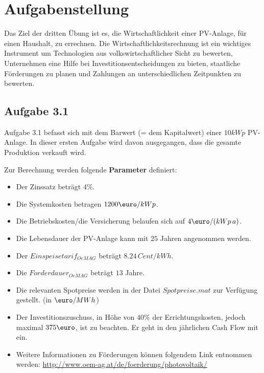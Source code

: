 \documentclass[a4paper,12pt]{article}
\begin{document}
	

	\newpage
	\tableofcontents

	\newpage
	\section{Aufgabenstellung}
	\label{sec:Aufgabenstellung}
	Das Ziel der dritten Übung ist es, die Wirtschaftlichkeit einer PV-Anlage, für einen Haushalt, zu errechnen.\newline
	Die Wirtschaftlichkeitsrechnung ist ein wichtiges Instrument um Technologien aus volkswirtschaftlicher Sicht zu bewerten,
	Unternehmen eine Hilfe bei Investitionsentscheidungen zu bieten, staatliche Förderungen zu planen und Zahlungen an unterschiedlichen Zeitpunkten zu bewerten.
	\subsection{Aufgabe 3.1}
	\label{sec:Aufgabenstellung31}
	Aufgabe 3.1 befasst sich mit dem Barwert (= dem Kapitalwert) einer $10kWp$ PV-Anlage.\newline
	In dieser ersten Aufgabe wird davon ausgegangen, dass die gesamte Produktion verkauft wird.\\ \par
	\noindent Zur Berechnung werden folgende \textbf{Parameter} definiert:
	\begin{itemize}
		\item Der Zinssatz beträgt $4\%$.
		\item Die Systemkosten betragen $1200\mbox{\euro}/kWp$.
		\item Die Betriebskosten/die Versicherung belaufen sich auf $4\mbox{\euro}/(kWp\,a)$.
		\item Die Lebensdauer der PV-Anlage kann mit $25$ Jahren angenommen werden.
		\item Der $Einspeisetarif_{OeMAG}$ beträgt $8.24\,Cent/kWh$.
		\item Die $F\ddot{o}rderdauer_{OeMAG}$ beträgt $13$ Jahre.
		\item Die relevanten Spotpreise werden in der Datei $Spotpreise.mat$ zur Verfügung gestellt. (in $\mbox{\euro}/MWh$)
		\item Der Investitionszuschuss, in Höhe von $40\%$ der Errichtungskosten, jedoch maximal $375\mbox{\euro}$, ist zu beachten. Er geht in den jährlichen Cash Flow mit ein.
		\item Weitere Informationen zu Förderungen können folgendem Link entnommen werden:\newline
		\url{http://www.oem-ag.at/de/foerderung/photovoltaik/}
	\end{itemize}
\end{document}
